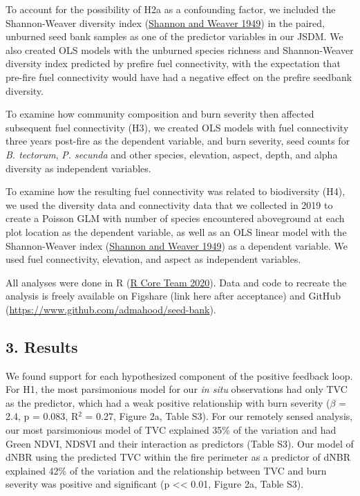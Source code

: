 \documentclass[
  12pt,
]{article}
\begin{document}
To account for the possibility of H2a as a confounding factor, we
included the Shannon-Weaver diversity index
(\protect\hyperlink{ref-Shannon1949}{Shannon and Weaver 1949}) in the
paired, unburned seed bank samples as one of the predictor variables in
our JSDM. We also created OLS models with the unburned species richness
and Shannon-Weaver diversity index predicted by prefire fuel
connectivity, with the expectation that pre-fire fuel connectivity would
have had a negative effect on the prefire seedbank diversity.

To examine how community composition and burn severity then affected
subsequent fuel connectivity (H3), we created OLS models with fuel
connectivity three years post-fire as the dependent variable, and burn
severity, seed counts for \emph{B. tectorum}, \emph{P. secunda} and
other species, elevation, aspect, depth, and alpha diversity as
independent variables.

To examine how the resulting fuel connectivity was related to
biodiversity (H4), we used the diversity data and connectivity data that
we collected in 2019 to create a Poisson GLM with number of species
encountered aboveground at each plot location as the dependent variable,
as well as an OLS linear model with the Shannon-Weaver index
(\protect\hyperlink{ref-Shannon1949}{Shannon and Weaver 1949}) as a
dependent variable. We used fuel connectivity, elevation, and aspect as
independent variables.

All analyses were done in R (\protect\hyperlink{ref-R}{R Core Team
2020}). Data and code to recreate the analysis is freely available on
Figshare (link here after acceptance) and GitHub
(\url{https://www.github.com/admahood/seed-bank}).

\hypertarget{results}{%
\subsection{3. Results}\label{results}}

We found support for each hypothesized component of the positive
feedback loop. For H1, the most parsimonious model for our \emph{in
situ} observations had only TVC as the predictor, which had a weak
positive relationship with burn severity (\(\beta\) = 2.4, p = 0.083,
R\(^2\) = 0.27, Figure 2a, Table S3). For our remotely sensed analysis,
our most parsimonious model of TVC explained 35\% of the variation and
had Green NDVI, NDSVI and their interaction as predictors (Table S3).
Our model of dNBR using the predicted TVC within the fire perimeter as a
predictor of dNBR explained 42\% of the variation and the relationship
between TVC and burn severity was positive and significant (p
\textless\textless{} 0.01, Figure 2a, Table S3).
\end{document}

